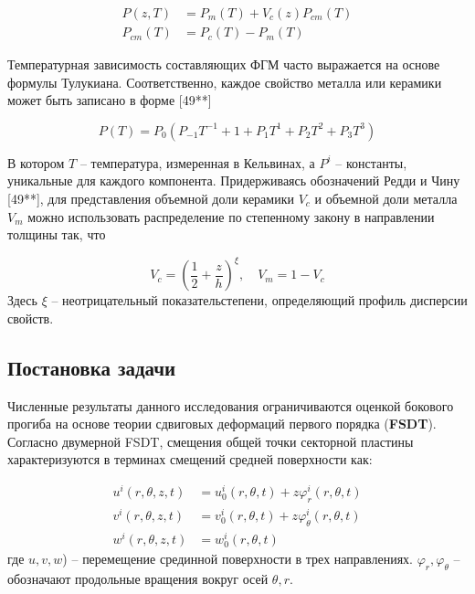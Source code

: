 \begin{equation}
	\label{eq:vibro2:1}
	\begin{split}
	P(z, T) &= P_m(T) + V_c (z) P_{cm}(T)\\
	P_{cm}(T) &= P_c(T) - P_m(T)
	\end{split}
\end{equation}

Температурная зависимость составляющих ФГМ часто выражается на основе формулы Тулукиана. Соответственно, каждое свойство металла или керамики может быть записано в форме [49**]

\begin{equation}
	\label{eq:vibro2:2}
		P(T) = P_0 \left (P_{-1}T^{-1}+1+P_1 T^1 + P_2 T^2 + P_3 T^3 \right )
\end{equation}

В котором \(T\) -- температура, измеренная в Кельвинах, а \(P^i\) -- константы, уникальные для каждого компонента. Придерживаясь обозначений Редди и Чину [49**], для представления объемной доли керамики \(V_c\) и объемной доли металла \(V_m\) можно использовать распределение по степенному закону в направлении толщины так, что

\begin{equation}
	\label{eq:vibro2:3}
	V_c = \left ( \frac{1}{2} + \frac{z}{h} \right ) ^{\xi}, \quad V_m = 1 - V_c
\end{equation}
Здесь \(\xi\) -- неотрицательный показательстепени, определяющий профиль дисперсии свойств.

\subsection{Постановка задачи}\label{ch:ch3/sec3/sub3}

Численные результаты данного исследования ограничиваются оценкой бокового прогиба на основе теории сдвиговых деформаций первого порядка (\textbf{FSDT}). Согласно двумерной FSDT, смещения общей точки секторной пластины характеризуются в терминах смещений средней поверхности как:

\begin{equation}
	\label{eq:vibro2:4}
	\begin{split}
		u^i (r, \theta, z, t) &= u_0^i(r, \theta, t)+ z \varphi_{r}^i (r, \theta,  t)\\
		v^i (r, \theta, z, t) &= v_0^i(r, \theta, t)+ z \varphi_{\theta}^i (r, \theta,  t)\\
		w^i (r, \theta, z, t) &= w_0^i (r, \theta, t)
	\end{split}
\end{equation}
где \(u, v, w\)) -- перемещение срединной поверхности в трех направлениях. \( \varphi_{r}, \varphi_{\theta} \) -- обозначают продольные вращения вокруг осей \( \theta, r\).


